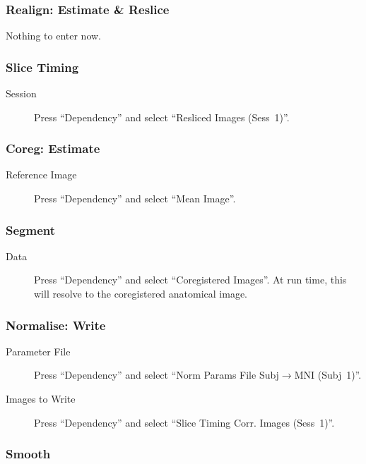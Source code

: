 \subsubsection*{Realign: Estimate \& Reslice}

Nothing to enter now.

\subsubsection*{Slice Timing}

\begin{description}
\item[Session] Press ``Dependency'' and select ``Resliced Images (Sess~1)''.
\end{description}

\subsubsection*{Coreg: Estimate}

\begin{description}
\item[Reference Image] Press ``Dependency'' and select ``Mean Image''.
\end{description}

\subsubsection*{Segment}

\begin{description}
\item[Data] Press ``Dependency'' and select ``Coregistered Images''. At run
  time, this will resolve to the coregistered anatomical image.
\end{description}

\subsubsection*{Normalise: Write}

\begin{description}
\item[Parameter File] Press ``Dependency'' and select ``Norm Params File
  Subj$\rightarrow$MNI (Subj~1)''.
\item[Images to Write] Press ``Dependency'' and select ``Slice Timing
  Corr. Images (Sess~1)''. 
\end{description}

\subsubsection*{Smooth}

